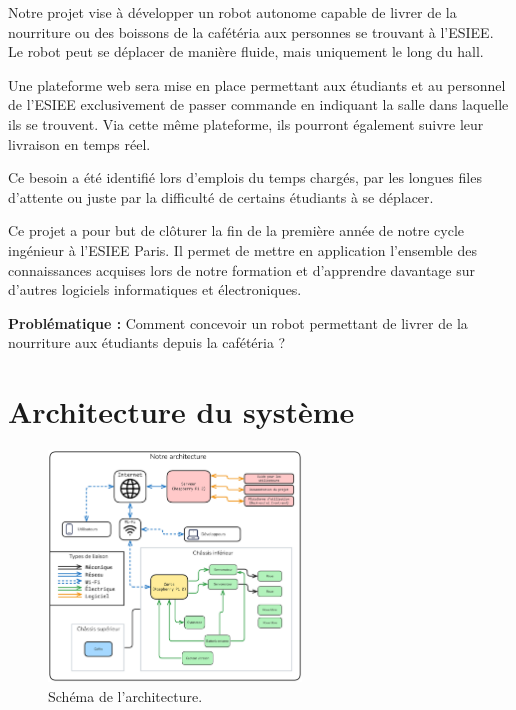 \documentclass[a4paper,12pt]{report}  %
\begin{document}
Notre projet vise à développer un robot autonome capable de livrer de la
nourriture ou des boissons de la cafétéria aux personnes se trouvant à
l'ESIEE. Le robot peut se déplacer de manière fluide, mais uniquement le
long du hall.

Une plateforme web sera mise en place permettant aux étudiants et au
personnel de l'ESIEE exclusivement de passer commande en indiquant la
salle dans laquelle ils se trouvent. Via cette même plateforme, ils
pourront également suivre leur livraison en temps réel.

Ce besoin a été identifié lors d'emplois du temps
chargés, par les longues files d'attente ou juste par la
difficulté de certains étudiants à se déplacer.

Ce projet a pour but de clôturer la fin de la première année de notre
cycle ingénieur à l'ESIEE Paris. Il permet de mettre en
application l'ensemble des connaissances acquises lors
de notre formation et d'apprendre davantage sur
d'autres logiciels informatiques et électroniques.

\textbf{Problématique :} Comment concevoir un robot permettant
de livrer de la nourriture aux étudiants depuis la cafétéria ?


\pagebreak
\section{Architecture du système}

\begin{figure}[H]
	\centering
	\includegraphics[width=0.6\textwidth]{./attachments/arch/2025-06-21-1200_Architecture.pdf}
	\caption{Schéma de l'architecture. }
\end{figure}
\end{document}
